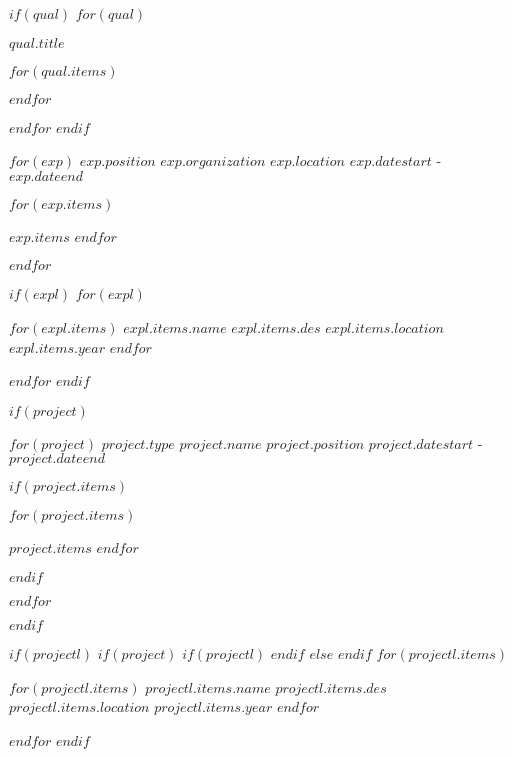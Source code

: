 \documentclass[11pt, a4paper]{awesome-cv}
\begin{document}
$if(qual)$
$for(qual)$
\vspace{6mm}
\begin{cvsubsection}{$qual.title$}
\vspace{2mm}
\begin{cvitems}
$for(qual.items)$
    \item{}
$endfor$
\end{cvitems}

$endfor$
$endif$
\begin{cventries}

$for(exp)$
\cventry
{$exp.position$}
{$exp.organization$}
{$exp.location$}
{$exp.datestart$ - $exp.dateend$} 
{
\begin{cvitems}
$for(exp.items)$
    \item{\normalsize $exp.items$}
$endfor$
\end{cvitems}
}
$endfor$
\end{cventries}

$if(expl)$
$for(expl)$
\begin{cvhonors}
$for(expl.items)$
\cvhonor
  {$expl.items.name$}
  {$expl.items.des$}
  {$expl.items.location$}
  {$expl.items.year$}
$endfor$
\end{cvhonors}
$endfor$
$endif$


$if(project)$
\begin{cventries}


$for(project)$
\cventry
{$project.type$}
{$project.name$}
{$project.position$}
{$project.datestart$ - $project.dateend$}
{
$if(project.items)$
\begin{cvitems}
$for(project.items)$
    \item{\normalsize $project.items$}
$endfor$
\end{cvitems}
$endif$
}
$endfor$
\end{cventries}
$endif$

$if(projectl)$
$if(project)$
$if(projectl)$
$endif$
$else$
$endif$
$for(projectl.items)$
\begin{cvhonors}
$for(projectl.items)$
\cvhonor
  {$projectl.items.name$}
  {$projectl.items.des$}
  {$projectl.items.location$}
  {$projectl.items.year$}
$endfor$
\end{cvhonors}
$endfor$
$endif$


\end{cvsubsection}
\end{document}
